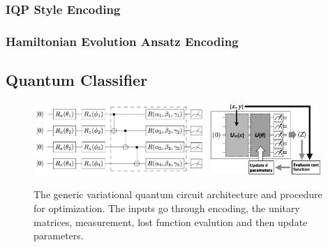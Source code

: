 \documentclass{article}
\begin{document}
\subsubsection*{IQP Style Encoding}

\subsubsection*{Hamiltonian Evolution Ansatz Encoding}


\subsection*{Quantum Classifier}

\begin{figure}[h]
  \begin{center}
    \includegraphics[width=0.58\textwidth]{vqc.png} 
    \includegraphics[width=0.38\textwidth]{vqc1.png} 
  \end{center}
  \caption{The generic variational quantum circuit 
  architecture and procedure for optimization. The 
  inputs go through encoding, the unitary matrices, 
  measurement, lost function evalution and then 
  update parameters.}
\end{figure}
\end{document}
